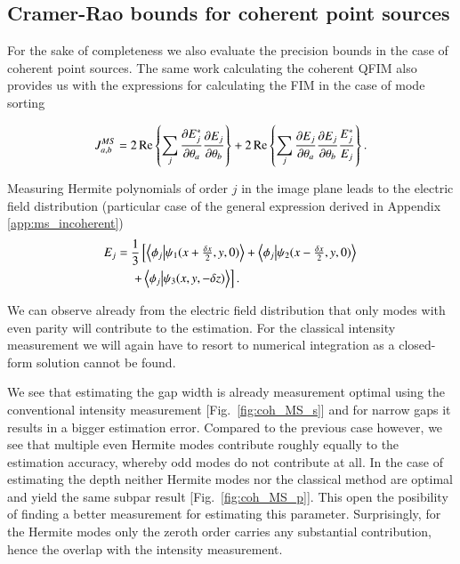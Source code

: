 \documentclass[reprint,amsmath,amssymb,aps,pra,floatfix]{revtex4-2}
\begin{document}
\subsection{\label{subsec:FI_ms_coherent} Cramer-Rao bounds for coherent point sources}
For the sake of completeness we also evaluate the precision bounds in the case of coherent point sources. The same work calculating the coherent QFIM \cite{da2021super} also provides us with the expressions for calculating the FIM in the case of mode sorting

\begin{align}
    J^{MS}_{a,b} = 2 \Re \left \{ \sum_j \pdv{E^*_j}{\theta_a} \pdv{E_j}{\theta_b} \right \} + 2 \Re \left \{ \sum_j \pdv{E_j}{\theta_a} \pdv{E_j}{\theta_b} \frac{E^*_j}{E_j} \right \}.
\end{align}

Measuring Hermite polynomials of order $j$ in the image plane leads to the electric field distribution (particular case of the general expression derived in Appendix \ref{app:ms_incoherent})
\begin{align}
\label{eq:three_sources_coherent_ms_prob}
     E_j =\ & \frac{1}{3} \left [ \braket{\phi_j}{ \psi_1 (x+\mbox{$\frac{\delta x}{2}$},y,0)} + \braket{\phi_j}{\psi_2 (x-\mbox{$\frac{\delta x}{2}$},y,0)} \right. \nonumber \\
     &\left. + \braket{\phi_j}{\psi_3 (x,y,-\delta z)} \right ].
\end{align}


We can observe already from the electric field distribution that only modes with even parity will contribute to the estimation. For the classical intensity measurement we  will again have to resort to numerical integration as a closed-form solution cannot be found.



We see that estimating the gap width is already measurement optimal using the conventional intensity measurement [Fig.~\ref{fig:coh_MS_s}] and for narrow gaps it results in a bigger estimation error. Compared to the previous case however, we see that multiple even Hermite modes contribute roughly equally to the estimation accuracy, whereby odd modes do not contribute at all. In the case of estimating the depth neither Hermite modes nor the classical method are optimal and yield the same subpar result [Fig.~\ref{fig:coh_MS_p}]. This open the posibility of finding a better measurement for estimating this parameter. Surprisingly, for the Hermite modes only the zeroth order carries any substantial contribution, hence the overlap with the intensity measurement.
\end{document}
